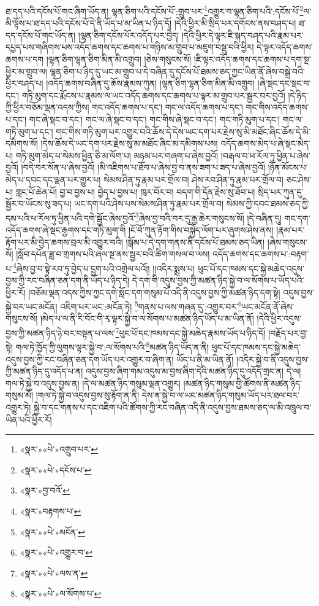 ཐ་དད་པའི་དངོས་པོ་གང་ཞིག་ཡོད་ན། ལྷན་ཅིག་པའི་དངོས་པོ་:གྲུབ་པར་\footnote{«སྣར་»«པེ་»འགྲུབ་པར་}འགྱུར་བ་ལྷན་ཅིག་པའི་:དངོས་པོ་\footnote{«སྣར་»«པེ་»དངོས་པ་}ལ་མི་ལྟོས་པ་ཐ་དད་པའི་དངོས་པོ་དེ་ནི་ཡོད་པ་མ་ཡིན་པ་ཉིད་དོ། །དེའི་ཕྱིར་མི་སྲིད་པར་དགོངས་ནས་བཤད་པ། ཐ་དད་དངོས་པོ་གང་ཡོད་ན། །ལྷན་ཅིག་དངོས་པོར་འདོད་པར་བྱེད། །དེའི་ཕྱིར་དེ་ལྟར་ཇི་སྐད་བཤད་པའི་རྣམ་པར་དཔྱད་པས་གཞིགས་པས་འདོད་ཆགས་དང་ཆགས་པ་གཉིས་མ་གྲུབ་པ་མཇུག་བསྡུ་བའི་ཕྱིར། དེ་ལྟར་འདོད་ཆགས་ཆགས་པ་དག །ལྷན་ཅིག་ལྷན་ཅིག་མིན་མི་འགྲུབ། །ཅེས་གསུངས་སོ། །ཇི་ལྟར་འདོད་ཆགས་དང་ཆགས་པ་དག་སྔ་ཕྱིར་མ་གྲུབ་ལ། ལྷན་ཅིག་པ་ཉིད་དུ་ཡང་མ་གྲུབ་པ་དེ་བཞིན་དུ་དངོས་པོ་ཐམས་ཅད་ཀྱང་ཡིན་ནོ་ཞེས་བསྒྲེ་བའི་ཕྱིར་བཤད་པ། །འདོད་ཆགས་བཞིན་དུ་ཆོས་རྣམས་ཀུན། །ལྷན་ཅིག་ལྷན་ཅིག་མིན་མི་འགྲུབ། །ཞེ་སྡང་དང་སྡང་བ་དང་། གཏི་མུག་དང་རྨོངས་པ་རྣམས་ལ་ཡང་འདོད་ཆགས་དང་ཆགས་པ་ལྟར་མ་གྲུབ་པར་སྦྱར་བར་བྱའོ། །དེ་ཉིད་ཀྱི་ཕྱིར་བཅོམ་ལྡན་འདས་ཀྱིས། གང་འདོད་ཆགས་པ་དང་། གང་ལ་འདོད་ཆགས་པ་དང་། གང་གིས་འདོད་ཆགས་པ་དང་། གང་ཞེ་སྡང་བ་དང་། གང་ལ་ཞེ་སྡང་བ་དང་། གང་གིས་ཞེ་སྡང་བ་དང་། གང་གཏི་མུག་པ་དང་། གང་ལ་གཏི་མུག་པ་དང་། གང་གིས་གཏི་མུག་པར་འགྱུར་བའི་ཆོས་དེ་དེས་ཡང་དག་པར་རྗེས་སུ་མི་མཐོང་ཞིང་ཆོས་དེ་མི་དམིགས་སོ། །དེས་ཆོས་དེ་ཡང་དག་པར་རྗེས་སུ་མ་མཐོང་ཞིང་མ་དམིགས་པས། འདོད་ཆགས་མེད་པ་ཞེ་སྡང་མེད་པ། གཏི་མུག་མེད་པ་སེམས་ཕྱིན་ཅི་མ་ལོག་པ། མཉམ་པར་གཞག་པ་ཞེས་བྱའོ། །བརྒལ་བ་ཕ་རོལ་ཏུ་ཕྱིན་པ་ཞེས་བྱའོ། །བདེ་བར་སོན་པ་ཞེས་བྱའོ། །མི་འཇིགས་པ་ཐོབ་པ་ཞེས་བྱ་བ་ནས་ཟག་པ་ཟད་པ་ཞེས་བྱའོ། །ཉོན་མོངས་པ་མེད་པ་དབང་དང་ལྡན་པར་གྱུར་པ། སེམས་ཤིན་ཏུ་རྣམ་པར་གྲོལ་བ། ཤེས་རབ་ཤིན་ཏུ་རྣམ་པར་གྲོལ་བ། ཅང་ཤེས་པ། གླང་པོ་ཆེན་པོ། བྱ་བ་བྱས་པ། བྱེད་པ་བྱས་པ། ཁུར་བོར་བ། བདག་གི་དོན་རྗེས་སུ་ཐོབ་པ། སྲིད་པར་ཀུན་དུ་སྦྱོར་བ་ཡོངས་སུ་ཟད་པ། ཡང་དག་པའི་ཤེས་པས་སེམས་ཤིན་ཏུ་རྣམ་པར་གྲོལ་བ། སེམས་ཀྱི་དབང་ཐམས་ཅད་ཀྱི་དམ་པའི་ཕ་རོལ་ཏུ་ཕྱིན་པའི་དགེ་སྦྱོང་ཞེས་བྱའོ་\footnote{«སྣར་»བྱ་བའོ་}ཞེས་བྱ་བའི་བར་དུ་རྒྱ་ཆེར་གསུངས་སོ། །དེ་བཞིན་དུ། གང་དག་འདོད་ཆགས་ཞེ་སྡང་རྒྱགས་དང་གཏི་མུག་གི །ངོ་བོ་ཀུན་རྟོག་གིས་བསྐྱེད་ལོག་པར་ཞུགས་ཤེས་ནས། །རྣམ་པར་རྟོག་པར་མི་བྱེད་ཆགས་བྲལ་མི་འགྱུར་བའི། །སྒོམ་པ་དེ་དག་གནས་ནི་དངོས་པོ་ཐམས་ཅད་ཡིན། །ཞེས་གསུངས་སོ། །སློབ་དཔོན་ཟླ་བ་གྲགས་པའི་ཞལ་སྔ་ནས་སྦྱར་བའི་ཚིག་གསལ་བ་ལས། འདོད་ཆགས་དང་ཆགས་པ་:བརྟག་པ་\footnote{«སྣར་»བརྟགས་པ་}ཞེས་བྱ་བ་སྟེ་རབ་ཏུ་བྱེད་པ་དྲུག་པའི་འགྲེལ་པའོ།། །།འདིར་སྨྲས་པ། ཕུང་པོ་དང་ཁམས་དང་སྐྱེ་མཆེད་འདུས་བྱས་ཀྱི་རང་བཞིན་ཅན་དག་ནི་ཡོད་པ་ཉིད་དེ། དེ་དག་གི་འདུས་བྱས་ཀྱི་མཚན་ཉིད་སྐྱེ་བ་ལ་སོགས་པ་ཡོད་པའི་ཕྱིར་རོ། །བཅོམ་ལྡན་འདས་ཀྱིས་ཀྱང་དགེ་སློང་དག་གསུམ་པོ་འདི་ནི་འདུས་བྱས་ཀྱི་མཚན་ཉིད་དག་སྟེ། འདུས་བྱས་སྐྱེ་བར་ཡང་མངོན། འཇིག་པར་ཡང་:མངོན་ཏེ། \footnote{«སྣར་»«པེ་»མངོན་}གནས་པ་ལས་གཞན་དུ་:འགྱུར་བར་\footnote{«སྣར་»«པེ་»འགྱུར་བ་}ཡང་མངོན་ནོ་ཞེས་གསུངས་སོ། །མེད་པ་ལ་ནི་རི་བོང་གི་རྭ་ལྟར་སྐྱེ་བ་ལ་སོགས་པ་མཚན་ཉིད་ཡོད་པ་མ་ཡིན་ནོ། །དེའི་ཕྱིར་འདུས་བྱས་ཀྱི་མཚན་ཉིད་ཉེ་བར་བསྟན་པ་ལས་\footnote{«སྣར་»«པེ་»ལས་ན་}ཕུང་པོ་དང་ཁམས་དང་སྐྱེ་མཆེད་རྣམས་ཡོད་པ་ཉིད་དོ། །བརྗོད་པར་བྱ་སྟེ། གལ་ཏེ་ཁྱོད་ཀྱི་ལུགས་ལྟར་སྐྱེ་བ་:ལ་སོགས་པའི་\footnote{«སྣར་»«པེ་»ལ་སོགས་པ་}མཚན་ཉིད་ཡོད་ན་ནི། ཕུང་པོ་དང་ཁམས་དང་སྐྱེ་མཆེད་འདུས་བྱས་ཀྱི་རང་བཞིན་ཅན་དག་ཡོད་པར་འགྱུར་བ་ཞིག་ན། ཡོད་པ་ནི་མ་ཡིན་ནོ། །འདིར་སྐྱེ་བ་ནི་འདུས་བྱས་ཀྱི་མཚན་ཉིད་དུ་འདོད་པ་ན། འདུས་བྱས་ཞིག་གམ་འདུས་མ་བྱས་ཞིག་དེའི་མཚན་ཉིད་དུ་འདོད་གྲང་ན། དེ་ལ། གལ་ཏེ་སྐྱེ་བ་འདུས་བྱས་ན། །དེ་ལ་མཚན་ཉིད་གསུམ་ལྡན་འགྱུར། །མཚན་ཉིད་གསུམ་གྱི་ཚོགས་ནི་མཚན་ཉིད་གསུམ་མོ། །གལ་ཏེ་སྐྱེ་བ་འདུས་བྱས་སུ་རྟོག་ན་ནི། དེས་ན་སྐྱེ་བ་ལ་ཡང་མཚན་ཉིད་གསུམ་ཡོད་པར་ཐལ་བར་འགྱུར་ཏེ། སྐྱེ་བ་དང་གནས་པ་དང་འཇིག་པའི་ཚོགས་ཀྱི་རང་བཞིན་འདི་ནི་འདུས་བྱས་ཐམས་ཅད་ལ་མི་འཁྲུལ་བ་ཡིན་པའི་ཕྱིར་རོ། 